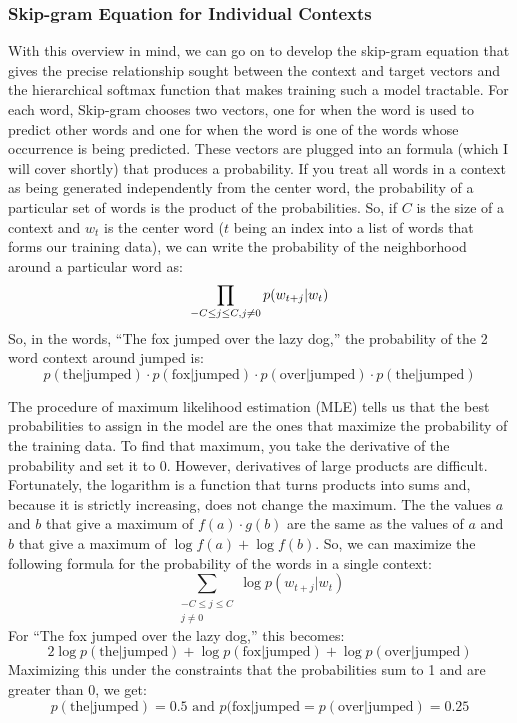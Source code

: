 \subsubsection{Skip-gram Equation for Individual Contexts}

With this overview in mind, we can go on to develop the skip-gram equation that
gives the precise relationship sought between the context and target vectors
and the hierarchical softmax function that makes training such a model 
tractable.
For each word, Skip-gram chooses two vectors, one for when the word is used to
predict other words and one for when the word is one of the words whose
occurrence is being predicted. These vectors are plugged into an formula (which
I will cover shortly) that produces a probability. If you treat all words in a
context as being generated independently from the center word, the probability
of a particular set of words is the product of the probabilities. So, if $C$ is
the size of a context and $w_t$ is the center word ($t$ being an index into a
list of words that forms our training data), we can write the probability of
the neighborhood around a particular word as:
%
\[\prod_{-C \le j \le C, \\ j \ne 0 } p(w_{t+j}|w_t)\]
%
So, in the words, ``The fox jumped over the lazy dog,'' the 
probability of the 2 word context around jumped is:
%
\[p(\text{the|jumped})\cdot{}p(\text{fox|jumped})\cdot{}p(\text{over|jumped})\cdot{}p(\text{the|jumped})\]

The procedure of maximum likelihood estimation (MLE) tells us that the best
probabilities to assign in the model are the ones that maximize the probability
of the training data. To find that maximum, you take the derivative of the
probability and set it to 0. However, derivatives of large products are 
difficult. Fortunately, the logarithm is a function that turns products into
sums and, because it is strictly increasing, does not change the maximum. The
the values $a$ and $b$ that give a maximum of $f(a)\cdot{}g(b)$ are the same as 
the values of $a$ and $b$ that give a maximum of
$\log{f(a)} + \log{f(b)}$. So, we can maximize the following formula for the
probability of the words in a single context:
%
\[\sum_{\substack{-C \le j \le C \\ j \ne 0 }} \log{p(w_{t+j}|w_t)}\]
%
For ``The fox jumped over the lazy dog,'' this becomes:
%
\[2\log{p(\text{the|jumped})}+\log{p(\text{fox|jumped})}+\log{p(\text{over|jumped})}\]
%
Maximizing this under the constraints that the probabilities sum to 1 and are
greater than 0, we get:
\[p(\text{the|jumped})=0.5 \text{ and } p(\text{fox|jumped}=p(\text{over|jumped})=0.25\]


